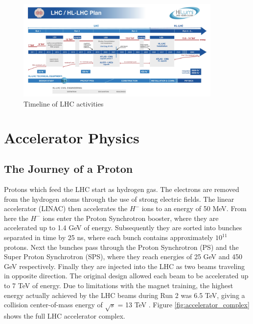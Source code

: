 \begin{figure}
        \centering
	\includegraphics[width=0.9\textwidth]{figures/ch2/hl_lhc_timeline.png}
	\caption{Timeline of LHC activities \cite{lhc_timeline}}
	\label{fig:lhc_timeline}
\end{figure}

 \section{Accelerator Physics}
 \subsection{The Journey of a Proton}
 Protons which feed the LHC start as hydrogen gas. The electrons are removed from the hydrogen atoms through the use of strong electric fields. The linear accelerator (LINAC) then accelerates the $H^-$ ions to an energy of 50 MeV. From here the $H^-$ ions enter the Proton Synchrotron booster, where they are accelerated up to 1.4 GeV of energy. Subsequently they are sorted into bunches separated in time by 25 ns,  where each bunch contains approximately $10^{11}$ protons. Next the bunches pass through the Proton Synchrotron (PS) and the Super Proton Synchrotron (SPS), where they reach energies of 25 GeV and 450 GeV respectively. Finally they are injected into the LHC as two beams traveling in opposite direction. The original design allowed each beam to be accelerated up to 7 TeV of energy. Due to limitations with the magnet training, the highest energy actually achieved by the LHC beams during Run 2 was 6.5 TeV, giving a collision center-of-mass energy of $\sqrt{s}$ = 13 TeV \cite{lhc_faq}. Figure \ref{fig:accelerator_complex} shows the full LHC accelerator complex.\\

